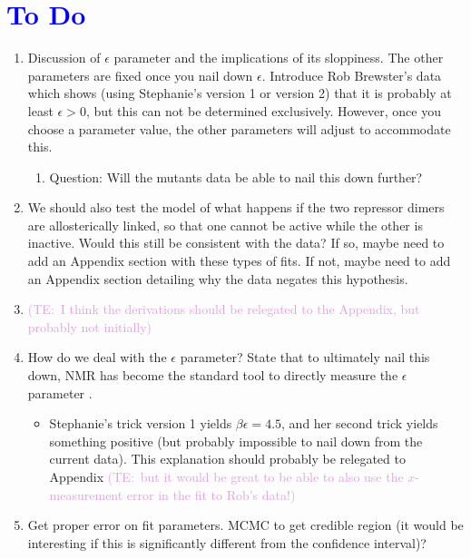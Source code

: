 \documentclass[10pt,letterpaper]{article}
\newcommand{\talComment}[1]{\textcolor{Plum}{(TE:~#1)}}
\begin{document}
\section*{\textcolor{blue}{To Do}}

\begin{enumerate}
	\item Discussion of $\epsilon$ parameter and the implications of its sloppiness. The other parameters are fixed once you nail down $\epsilon$. Introduce Rob Brewster's data  which shows (using Stephanie's version 1 or version 2) that it is probably at least $\epsilon > 0$, but this can not be determined exclusively. However, once you choose a parameter value, the other parameters will adjust to accommodate this.
	\begin{enumerate}
		\item Question: Will the mutants data be able to nail this down further?
	\end{enumerate}
	
	\item We should also test the model of what happens if the two repressor dimers are allosterically linked, so that one cannot be active while the other is inactive. Would this still be consistent with the data? If so, maybe need to add an Appendix section with these types of fits. If not, maybe need to add an Appendix section detailing why the data negates this hypothesis.
	
	\item \talComment{I think the derivations should be relegated to the Appendix, but probably not initially}
	
	\item How do we deal with the $\epsilon$ parameter? State that to ultimately nail this down, NMR has become the standard tool to directly measure the $\epsilon$ parameter \cite{Gardino2003, Boulton2016}.
	\begin{itemize}
		\item Stephanie's trick version 1 yields $\beta \epsilon = 4.5$, and her second trick yields something positive (but probably impossible to nail down from the current data). This explanation should probably be relegated to Appendix \talComment{but it would be great to be able to also use the $x$-measurement error in the fit to Rob's data!}
	\end{itemize}
	
	\item Get proper error on fit parameters. MCMC to get credible region (it would be interesting if this is significantly different from the confidence interval)?
\end{enumerate}
\end{document}
